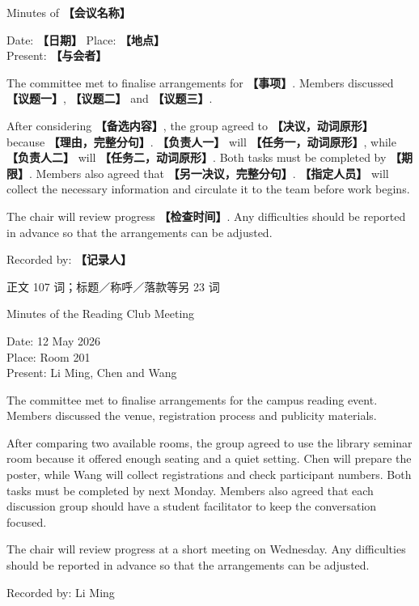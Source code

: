 \documentclass[11pt,a4paper,fontset=macnew]{ctexart}
\newenvironment{writing}{\begingroup\fontsize{10.5}{13.5}\selectfont\setlength{\parskip}{3pt}}{\par\endgroup}
\newenvironment{example}{\begingroup\fontsize{11}{14.3}\selectfont\setlength{\parskip}{4pt}}{\par\endgroup}
\begin{document}
\begin{writing}
{\centering Minutes of {\bfseries 【会议名称】}\par}
\noindent Date: {\bfseries 【日期】}   Place: {\bfseries 【地点】}\\Present: {\bfseries 【与会者】}\par
The committee met to finalise arrangements for {\bfseries 【事项】}. Members discussed {\bfseries 【议题一】}, {\bfseries 【议题二】} and {\bfseries 【议题三】}.

After considering {\bfseries 【备选内容】}, the group agreed to {\bfseries 【决议，动词原形】} because {\bfseries 【理由，完整分句】}. {\bfseries 【负责人一】} will {\bfseries 【任务一，动词原形】}, while {\bfseries 【负责人二】} will {\bfseries 【任务二，动词原形】}. Both tasks must be completed by {\bfseries 【期限】}. Members also agreed that {\bfseries 【另一决议，完整分句】}. {\bfseries 【指定人员】} will collect the necessary information and circulate it to the team before work begins.

The chair will review progress {\bfseries 【检查时间】}. Any difficulties should be reported in advance so that the arrangements can be adjusted.

\noindent Recorded by: {\bfseries 【记录人】}\par
\end{writing}
\par\vspace{4pt}{\bfseries 完整套用示例}\par\nopagebreak
{\small 正文 107 词；标题／称呼／落款等另 23 词}\par
\begin{example}
{\centering Minutes of the Reading Club Meeting\par}
\noindent Date: 12 May 2026\\Place: Room 201\\Present: Li Ming, Chen and Wang\par
The committee met to finalise arrangements for the campus reading event. Members discussed the venue, registration process and publicity materials.

After comparing two available rooms, the group agreed to use the library seminar room because it offered enough seating and a quiet setting. Chen will prepare the poster, while Wang will collect registrations and check participant numbers. Both tasks must be completed by next Monday. Members also agreed that each discussion group should have a student facilitator to keep the conversation focused.

The chair will review progress at a short meeting on Wednesday. Any difficulties should be reported in advance so that the arrangements can be adjusted.

\noindent Recorded by: Li Ming\par
\end{example}
\end{document}

